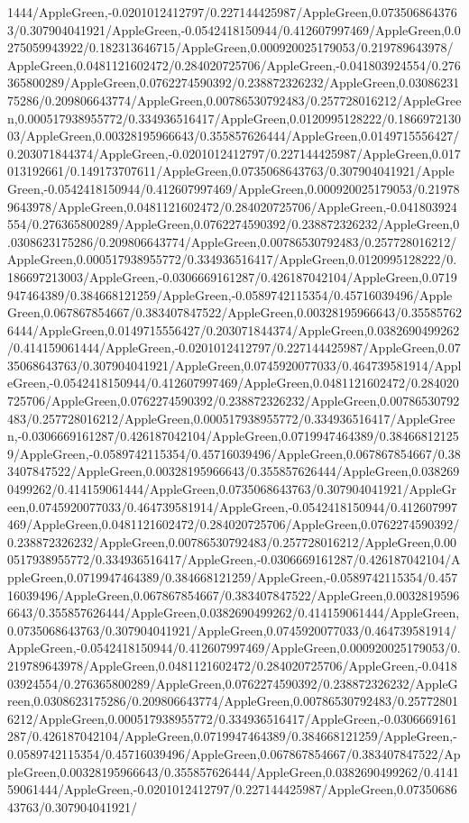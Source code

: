 {\begin{tikzternal}
{1444/AppleGreen,-0.0201012412797/0.227144425987/AppleGreen,0.0735068643763/0.307904041921/AppleGreen,-0.0542418150944/0.412607997469/AppleGreen,0.0275059943922/0.182313646715/AppleGreen,0.000920025179053/0.219789643978/AppleGreen,0.0481121602472/0.284020725706/AppleGreen,-0.041803924554/0.276365800289/AppleGreen,0.0762274590392/0.238872326232/AppleGreen,0.0308623175286/0.209806643774/AppleGreen,0.00786530792483/0.257728016212/AppleGreen,0.000517938955772/0.334936516417/AppleGreen,0.0120995128222/0.186697213003/AppleGreen,0.00328195966643/0.355857626444/AppleGreen,0.0149715556427/0.203071844374/AppleGreen,-0.0201012412797/0.227144425987/AppleGreen,0.017013192661/0.149173707611/AppleGreen,0.0735068643763/0.307904041921/AppleGreen,-0.0542418150944/0.412607997469/AppleGreen,0.000920025179053/0.219789643978/AppleGreen,0.0481121602472/0.284020725706/AppleGreen,-0.041803924554/0.276365800289/AppleGreen,0.0762274590392/0.238872326232/AppleGreen,0.0308623175286/0.209806643774/AppleGreen,0.00786530792483/0.257728016212/AppleGreen,0.000517938955772/0.334936516417/AppleGreen,0.0120995128222/0.186697213003/AppleGreen,-0.0306669161287/0.426187042104/AppleGreen,0.0719947464389/0.384668121259/AppleGreen,-0.0589742115354/0.45716039496/AppleGreen,0.067867854667/0.383407847522/AppleGreen,0.00328195966643/0.355857626444/AppleGreen,0.0149715556427/0.203071844374/AppleGreen,0.0382690499262/0.414159061444/AppleGreen,-0.0201012412797/0.227144425987/AppleGreen,0.0735068643763/0.307904041921/AppleGreen,0.0745920077033/0.464739581914/AppleGreen,-0.0542418150944/0.412607997469/AppleGreen,0.0481121602472/0.284020725706/AppleGreen,0.0762274590392/0.238872326232/AppleGreen,0.00786530792483/0.257728016212/AppleGreen,0.000517938955772/0.334936516417/AppleGreen,-0.0306669161287/0.426187042104/AppleGreen,0.0719947464389/0.384668121259/AppleGreen,-0.0589742115354/0.45716039496/AppleGreen,0.067867854667/0.383407847522/AppleGreen,0.00328195966643/0.355857626444/AppleGreen,0.0382690499262/0.414159061444/AppleGreen,0.0735068643763/0.307904041921/AppleGreen,0.0745920077033/0.464739581914/AppleGreen,-0.0542418150944/0.412607997469/AppleGreen,0.0481121602472/0.284020725706/AppleGreen,0.0762274590392/0.238872326232/AppleGreen,0.00786530792483/0.257728016212/AppleGreen,0.000517938955772/0.334936516417/AppleGreen,-0.0306669161287/0.426187042104/AppleGreen,0.0719947464389/0.384668121259/AppleGreen,-0.0589742115354/0.45716039496/AppleGreen,0.067867854667/0.383407847522/AppleGreen,0.00328195966643/0.355857626444/AppleGreen,0.0382690499262/0.414159061444/AppleGreen,0.0735068643763/0.307904041921/AppleGreen,0.0745920077033/0.464739581914/AppleGreen,-0.0542418150944/0.412607997469/AppleGreen,0.000920025179053/0.219789643978/AppleGreen,0.0481121602472/0.284020725706/AppleGreen,-0.041803924554/0.276365800289/AppleGreen,0.0762274590392/0.238872326232/AppleGreen,0.0308623175286/0.209806643774/AppleGreen,0.00786530792483/0.257728016212/AppleGreen,0.000517938955772/0.334936516417/AppleGreen,-0.0306669161287/0.426187042104/AppleGreen,0.0719947464389/0.384668121259/AppleGreen,-0.0589742115354/0.45716039496/AppleGreen,0.067867854667/0.383407847522/AppleGreen,0.00328195966643/0.355857626444/AppleGreen,0.0382690499262/0.414159061444/AppleGreen,-0.0201012412797/0.227144425987/AppleGreen,0.0735068643763/0.307904041921/}
\end{tikzternal}}
